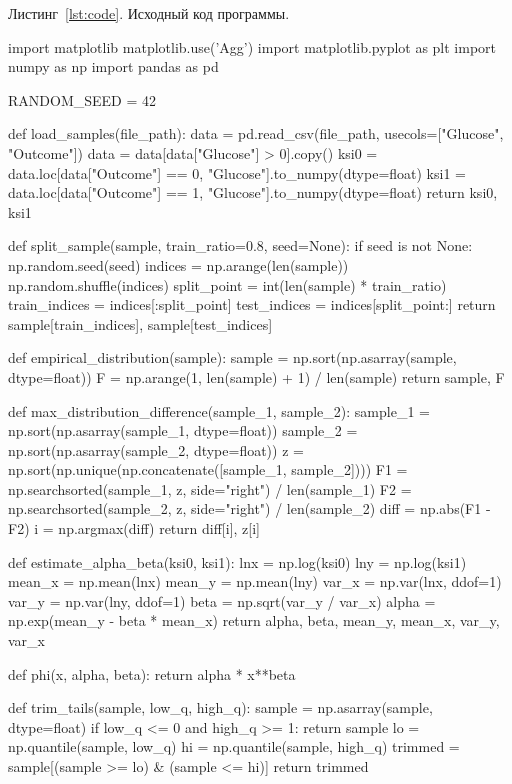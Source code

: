 \documentclass[a4paper, 14pt]{extarticle}
\begin{document}
\label{lst:code}
\noindent Листинг~\ref{lst:code}. Исходный код программы.

\begin{breakablelisting}
import matplotlib
matplotlib.use('Agg')
import matplotlib.pyplot as plt
import numpy as np
import pandas as pd

RANDOM_SEED = 42


def load_samples(file_path):
    data = pd.read_csv(file_path, usecols=["Glucose", "Outcome"])
    data = data[data["Glucose"] > 0].copy()
    ksi0 = data.loc[data["Outcome"] == 0, "Glucose"].to_numpy(dtype=float)
    ksi1 = data.loc[data["Outcome"] == 1, "Glucose"].to_numpy(dtype=float)
    return ksi0, ksi1


def split_sample(sample, train_ratio=0.8, seed=None):
    if seed is not None:
        np.random.seed(seed)
    indices = np.arange(len(sample))
    np.random.shuffle(indices)
    split_point = int(len(sample) * train_ratio)
    train_indices = indices[:split_point]
    test_indices = indices[split_point:]
    return sample[train_indices], sample[test_indices]


def empirical_distribution(sample):
    sample = np.sort(np.asarray(sample, dtype=float))
    F = np.arange(1, len(sample) + 1) / len(sample)
    return sample, F


def max_distribution_difference(sample_1, sample_2):
    sample_1 = np.sort(np.asarray(sample_1, dtype=float))
    sample_2 = np.sort(np.asarray(sample_2, dtype=float))
    z = np.sort(np.unique(np.concatenate([sample_1, sample_2])))
    F1 = np.searchsorted(sample_1, z, side="right") / len(sample_1)
    F2 = np.searchsorted(sample_2, z, side="right") / len(sample_2)
    diff = np.abs(F1 - F2)
    i = np.argmax(diff)
    return diff[i], z[i]


def estimate_alpha_beta(ksi0, ksi1):
    lnx = np.log(ksi0)
    lny = np.log(ksi1)
    mean_x = np.mean(lnx)
    mean_y = np.mean(lny)
    var_x = np.var(lnx, ddof=1)
    var_y = np.var(lny, ddof=1)
    beta = np.sqrt(var_y / var_x)
    alpha = np.exp(mean_y - beta * mean_x)
    return alpha, beta, mean_y, mean_x, var_y, var_x


def phi(x, alpha, beta):
    return alpha * x**beta


def trim_tails(sample, low_q, high_q):
    sample = np.asarray(sample, dtype=float)
    if low_q <= 0 and high_q >= 1:
        return sample
    lo = np.quantile(sample, low_q)
    hi = np.quantile(sample, high_q)
    trimmed = sample[(sample >= lo) & (sample <= hi)]
    return trimmed



\end{breakablelisting}
\end{document}
